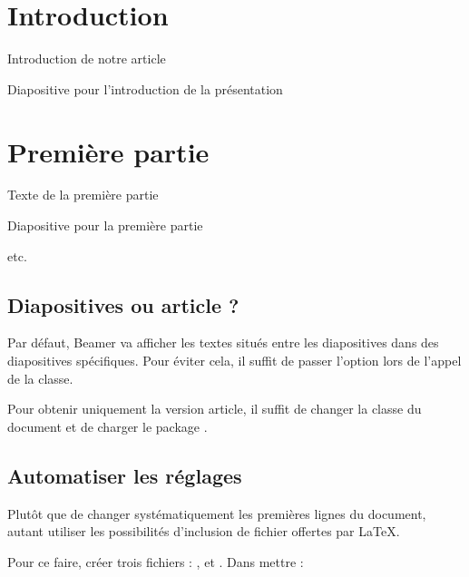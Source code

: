 \begin{latexcode}
\section{Introduction}

Introduction de notre article
\begin{frame}
	Diapositive pour l'introduction de la présentation
\end{frame}

\section{Première partie}

Texte de la première partie
\begin{frame}
	Diapositive pour la première partie
\end{frame}

etc.
\end{latexcode}

\subsection{Diapositives ou article ?}

Par défaut, Beamer va afficher les textes situés entre les diapositives dans des diapositives spécifiques. Pour éviter cela, il suffit de passer l'option  lors de l'appel de la classe.


Pour obtenir uniquement la version article, il suffit de changer la classe du document et de charger le package .


\subsection{Automatiser les réglages}

Plutôt que de changer systématiquement les premières lignes du document, autant utiliser les possibilités d'inclusion de fichier offertes par \LaTeX{}. 

Pour ce faire, créer trois fichiers :  ,  et .
Dans  mettre :

